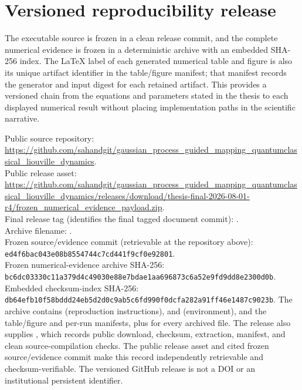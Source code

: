 \documentclass[
  11pt,
  letterpaper,
  onehalfspacing,
  normalmargins,
  equalmargins,
  oneside
]{ut-thesis}
\begin{document}
\section{Versioned reproducibility release}
\label{appsec:versioned-release}

The executable source is frozen in a clean release commit, and the complete
numerical evidence is frozen in a deterministic archive with an embedded
SHA-256 index. The LaTeX label of each generated numerical table and figure is
also its unique artifact identifier in the table/figure manifest; that
manifest records the generator and input digest for each retained artifact.
This provides a versioned chain from the equations and parameters stated in
the thesis to each displayed numerical result without placing implementation
paths in the scientific narrative.

\begingroup\small\sloppy
Public source repository:
\url{https://github.com/sahandgit/gaussian_process_guided_mapping_quantumclassical_liouville_dynamics}.\\
Public release asset:
\url{https://github.com/sahandgit/gaussian_process_guided_mapping_quantumclassical_liouville_dynamics/releases/download/thesis-final-2026-08-01-r4/frozen_numerical_evidence_payload.zip}.\\
Final release tag (identifies the final tagged document commit):
.\\
Archive filename:
.\\
Frozen source/evidence commit (retrievable at the repository above):
\texttt{ed4f6bac\allowbreak{}043e08b8\allowbreak{}554744c7\allowbreak{}cd441f9c\allowbreak{}f0e92801}.\\
Frozen numerical-evidence archive SHA-256:
\texttt{bc6dc033\allowbreak{}30c11a37\allowbreak{}9d4c4903\allowbreak{}0e88e7bd\allowbreak{}ae1aa696\allowbreak{}873c6a52\allowbreak{}e9fd9dd8\allowbreak{}e2300d0b}.\\
Embedded checksum-index SHA-256:
\texttt{db64efb1\allowbreak{}0f58bddd\allowbreak{}24eb5d2d\allowbreak{}0c9ab5c6\allowbreak{}fd990f0d\allowbreak{}cfa282a9\allowbreak{}1ff46e14\allowbreak{}87c9023b}.
The archive contains  (reproduction instructions),  and  (environment),  and the table/figure and per-run manifests, plus  for every archived file. The release also supplies , which records public download, checksum, extraction, manifest, and clean source-compilation checks. The public release asset and cited frozen source/evidence commit make this record independently retrievable and checksum-verifiable. The versioned GitHub release is not a DOI or an institutional persistent identifier.
\endgroup





\end{document}
